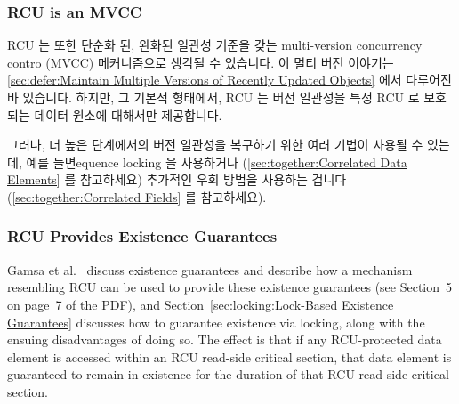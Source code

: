 \fi

\subsubsection{RCU is an MVCC}
\label{sec:defer:RCU is an MVCC}

RCU 는 또한 단순화 된, 완화된 일관성 기준을 갖는 multi-version concurrency
contro (MVCC) 메커니즘으로 생각될 수 있습니다.
이 멀티 버전 이야기는
\cref{sec:defer:Maintain Multiple Versions of Recently Updated Objects}
에서 다루어진 바 있습니다.
하지만, 그 기본적 형태에서, RCU 는 버전 일관성을 특정 RCU 로 보호되는 데이터
원소에 대해서만 제공합니다.

그러나, 더 높은 단계에서의 버전 일관성을 복구하기 위한 여러 기법이 사용될 수
있는데, 예를 들면equence locking 을 사용하거나
(\cref{sec:together:Correlated Data Elements} 를 참고하세요)
추가적인 우회 방법을 사용하는 겁니다
(\cref{sec:together:Correlated Fields} 를 참고하세요).

\subsubsection{RCU Provides Existence Guarantees}
\label{sec:defer:RCU Provides Existence Guarantees}

Gamsa et al.~\cite{Gamsa99}
discuss existence guarantees and describe how a mechanism
resembling RCU can be used to provide these existence guarantees
(see Section~5 on page~7 of the PDF), and
Section~\ref{sec:locking:Lock-Based Existence Guarantees}
discusses how to guarantee existence via locking, along with the
ensuing disadvantages of doing so.
The effect is that if any RCU-protected data element is accessed
within an RCU read-side critical section, that data element is
guaranteed to remain in existence for the duration of that RCU
read-side critical section.

